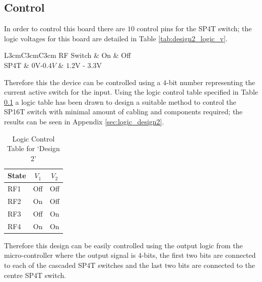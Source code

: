 \documentclass[12pt,openany,a4paper]{book}
\begin{document}
\subsection{Control}
In order to control this  board there are $10$ control pins for the SP4T switch; the logic voltages for this board are detailed in Table \ref{tab:design2_logic_v}.
\begin{table}[H]
	\centering
	\begin{tabular}{L{3cm}C{3cm}C{3cm}}
	\hline
	RF Switch & On & Off\\
	\hline
	SP4T & $0$V-$0.4V$ & $1.2$V - $3.3$V \\
	\hline	
	\end{tabular}
	\caption{Logic Voltage Control}
	\label{tab:design2_logic_v}
\end{table}
Therefore this the device can be controlled using a $4$-bit number representing the current active switch for the input. Using the logic control table specified in Table \ref{} a logic table has been drawn to design a suitable method to control the SP16T switch with minimal amount of cabling and components required; the results can be seen in Appendix \ref{sec:logic_design2}. 
\begin{table}[H]
	\centering
	\begin{tabular}{l c c }
		\hline
		State & $V_1$ & $V_2$\\
		\hline
		RF1 & Off & Off \\
		RF2 & On & Off \\
		RF3 & Off & On\\
		RF4 & On & On		\\
		\hline
	\end{tabular}
    \caption{Logic Control Table for `Design 2'} \label{tab:logic-cont-design2}
\end{table}
Therefore this design can be easily controlled using the output logic from the micro-controller where the output signal is $4$-bits, the first two bits are connected to each of the cascaded SP4T switches and the last two bits are connected to the centre SP4T switch.
\end{document}
